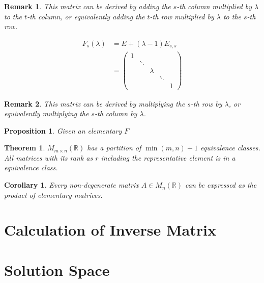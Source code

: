 \documentclass[onecolumn]{ctexart}
\newtheorem{theorem}{Theorem}
\newtheorem{proposition}{Proposition}
\newtheorem{corollary}{Corollary}
\newtheorem{remark}{Remark}
\begin{document}
\begin{remark}
  This matrix can be derived by adding the $s$-th column multiplied by $\lambda$ 
  to the $t$-th column, or equivalently adding the $t$-th row multiplied by 
  $\lambda$ to the $s$-th row.
\end{remark}
\begin{equation}
  \begin{split}
    F_{s}(\lambda) &= E + (\lambda - 1)E_{s,s} \\
                   &= 
                   \begin{pmatrix}
                     1 \\
                       & \ddots \\
                       &        & \lambda \\
                       &        &         & \ddots \\
                       &        &         &        & 1
                   \end{pmatrix}
  \end{split}
\end{equation}
\begin{remark}
  This matrix can be derived by multiplying the $s$-th row by $\lambda$, or 
  equivalently multiplying the $s$-th column by $\lambda$.
\end{remark}

\begin{proposition}
  Given an elementary $F$ 
\end{proposition}

\begin{theorem}
  $M_{m \times n}(\mathbb{R})$ has a partition of $\min(m, n) + 1$ equivalence 
  classes. All matrices with its rank as $r$ including the representative 
  element is in a equivalence class.
\end{theorem}

\begin{corollary}
  Every non-degenerate matrix $A \in M_n(\mathbb{R})$ can be expressed as the 
  product of elementary matrices.
\end{corollary}

\section{Calculation of Inverse Matrix}

\section{Solution Space}
\end{document}

